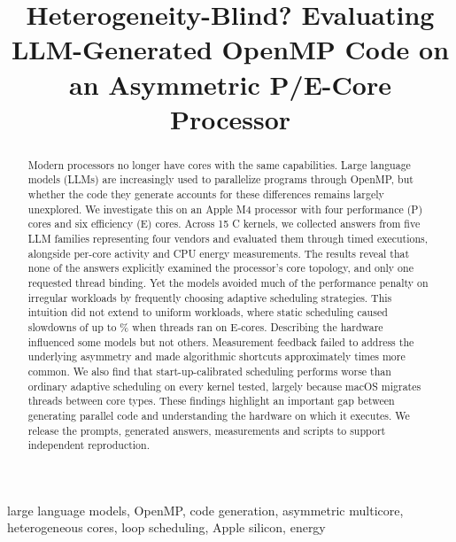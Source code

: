 \documentclass[conference]{IEEEtran}
\begin{document}
\title{Heterogeneity-Blind? Evaluating LLM-Generated OpenMP Code on an Asymmetric P/E-Core Processor}
\author{
}
\maketitle

\begin{abstract}
Modern processors no longer have cores with the same capabilities. Large language models (LLMs) are increasingly used to parallelize programs through OpenMP, but whether the code they generate accounts for these differences remains largely unexplored. We investigate this on an Apple M4 processor with four performance (P) cores and six efficiency (E) cores. Across 15 C kernels, we collected \NumAllAnswers{} answers from five LLM families representing four vendors and evaluated them through \NumTimedRunsAll{} timed executions, alongside per-core activity and CPU energy measurements. The results reveal that none of the \NumAllAnswers{} answers explicitly examined the processor's core topology, and only one requested thread binding. Yet the models avoided much of the performance penalty on irregular workloads by frequently choosing adaptive scheduling strategies. This intuition did not extend to uniform workloads, where static scheduling caused slowdowns of up to \NumStaticUniMax\% when threads ran on E-cores. Describing the hardware influenced some models but not others. Measurement feedback failed to address the underlying asymmetry and made algorithmic shortcuts approximately \NumShortcutRatio{} times more common. We also find that start-up-calibrated scheduling performs worse than ordinary adaptive scheduling on every kernel tested, largely because macOS migrates threads between core types. These findings highlight an important gap between generating parallel code and understanding the hardware on which it executes. We release the prompts, generated answers, measurements and scripts to support independent reproduction.
\end{abstract}

\begin{IEEEkeywords}
large language models, OpenMP, code generation, asymmetric multicore, heterogeneous cores, loop scheduling, Apple silicon, energy
\end{IEEEkeywords}
\end{document}
